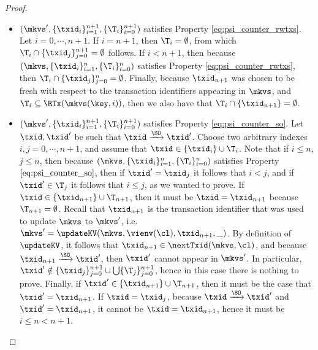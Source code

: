\begin{proof}
\begin{itemize}
\begin{itemize}
\item $(\mkvs', \{\txid_{i}\}_{i=1}^{n+1}, \{\T_{i}\}_{i=0}^{n+1})$ 
satisfies Property \eqref{eq:psi_counter_rwtxs}. Let $i =0, \cdots, n+1$. If $i = n+1$, then 
$\T_{i} = \emptyset$, from which $\T_{i} \cap \{\txid_{j}\}_{j=0}^{n+1} = \emptyset$ follows. If $i < n+1$, then 
because $(\mkvs, \{\txid_{i}\}_{i=1}^{n}, \{\T_{i}\}_{i=0}^{n})$ 
satisfies Property \eqref{eq:psi_counter_rwtxs}, then $\T_{i} \cap \{\txid_{j}\}_{j=0}^{n} = \emptyset$. 
Finally, because $\txid_{n+1}$ was chosen to be fresh with respect to the transaction identifiers appearing in 
$\mkvs$, and $\T_{i} \subseteq \RTx(\mkvs(\key, i))$, then  we also have that $\T_{i} \cap \{\txid_{n+1}\} = \emptyset$. 
\item $(\mkvs', \{\txid_{i}\}_{i=1}^{n+1}, \{\T_{i}\}_{i=0}^{n+1})$ satisfies Property \eqref{eq:psi_counter_so}. Let 
$\txid, \txid'$ be such that $\txid \xrightarrow{\SO} \txid'$. Choose two arbitrary indexes $i,j=0,\cdots, n+1$, 
and assume that $\txid \in \{\txid_{i}\} \cup \T_{i}$. Note that if $i \leq n$, $j \leq n$, then 
because $(\mkvs, \{\txid_{i}\}_{i=1}^{n}, \{\T_{i}\}_{i=0}^{n})$ satisfies Property $\eqref{eq:psi_counter_so}$, then 
if $\txid' = \txid_{j}$ it follows that $i < j$, and if $\txid' \in \T_{j}$ it follows that $i \leq j$, as 
we wanted to prove. 
If $\txid \in \{\txid_{n+1}\} \cup \T_{n+1}$, then it must be $\txid = \txid_{n+1}$ because 
$\T_{n+1} = \emptyset$. Recall that $\txid_{n+1}$ is the transaction identifier that was used 
to update $\mkvs$ to $\mkvs'$, i.e. $\mkvs' = \updateKV(\mkvs, \vienv(\cl), \txid_{n+1}, \_)$. By 
definition of $\updateKV$, it follows that $\txid_{n+1} \in \nextTxid(\mkvs, \cl)$, 
and because $\txid_{n+1} \xrightarrow{\SO} \txid'$, then $\txid'$ cannot appear in $\mkvs'$. 
In particular, 
$\txid' \notin \{\txid_{j}\}_{j=0}^{n+1} \cup \bigcup \{\T_{j}\}_{j=0}^{n+1}$, hence in this case there is nothing to prove. 
Finally, if $\txid' \in \{\txid_{n+1}\} \cup \T_{n+1}$, then 
it must be the case that $\txid' = \txid_{n+1}$. If $\txid = \txid_{j}$, because 
$\txid \xrightarrow{\SO} \txid'$ and $\txid' = \txid_{n+1}$, it cannot be $\txid = \txid_{n+1}$, 
hence it must be $i \leq n < n+1$. 

\end{itemize}
\end{itemize}
\end{proof}
